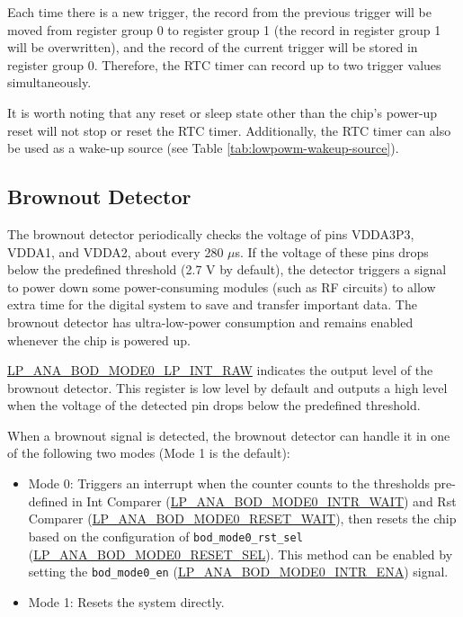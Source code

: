 \documentclass[main\_\_EN.tex]{subfiles}
\begin{document}
Each time there is a new trigger, the record from the previous trigger will be moved from register group 0 to register group 1 (the record in register group 1 will be overwritten), and the record of the current trigger will be stored in register group 0. Therefore, the RTC timer can record up to two trigger values simultaneously.

It is worth noting that any reset or sleep state other than the chip's power-up reset will not stop or reset the RTC timer. Additionally, the RTC timer can also be used as a wake-up source (see Table \ref{tab:lowpowm-wakeup-source}).

\subsection{Brownout Detector}

The brownout detector periodically checks the voltage of pins VDDA3P3, VDDA1, and VDDA2, about every 280 $\mu$s. If the voltage of these pins drops below the predefined threshold (2.7 V by default), the detector triggers a signal to power down some power-consuming modules (such as RF circuits) to allow extra time for the digital system to save and transfer important data. The brownout detector has ultra-low-power consumption and remains enabled whenever the chip is powered up.

\hyperref[fielddesc:LPANABODMODE0LPINTRAW]{LP\_ANA\_BOD\_MODE0\_LP\_INT\_RAW} indicates the output level of the brownout detector. This register is low level by default and outputs a high level when the voltage of the detected pin drops below the predefined threshold.

When a brownout signal is detected, the brownout detector can handle it in one of the following two modes (Mode 1 is the default):

\begin{itemize}
    \item Mode 0: Triggers an interrupt when the counter counts to the thresholds pre-defined in Int Comparer (\hyperref[fielddesc:LPANABODMODE0INTRWAIT]{LP\_ANA\_BOD\_MODE0\_INTR\_WAIT}) and Rst Comparer (\hyperref[fielddesc:LPANABODMODE0RESETWAIT]{LP\_ANA\_BOD\_MODE0\_RESET\_WAIT}), then resets the chip based on the configuration of \texttt{bod\_mode0\_rst\_sel} (\hyperref[fielddesc:LPANABODMODE0RESETSEL]{LP\_ANA\_BOD\_MODE0\_RESET\_SEL}). This method can be enabled by setting the \texttt{bod\_mode0\_en} (\hyperref[fielddesc:LPANABODMODE0INTRENA]{LP\_ANA\_BOD\_MODE0\_INTR\_ENA}) signal.
    \item Mode 1: Resets the system directly.
\end{itemize}
\end{document}

